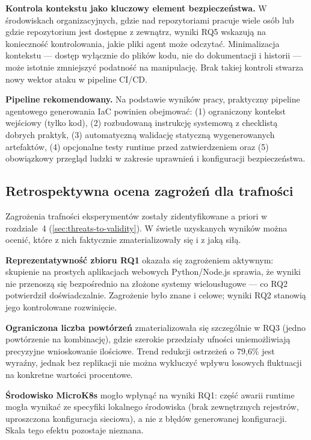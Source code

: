 \textbf{Kontrola kontekstu jako kluczowy element bezpieczeństwa.} W środowiskach organizacyjnych, gdzie nad repozytoriami pracuje wiele osób lub gdzie repozytorium jest dostępne z zewnątrz, wyniki RQ5 wskazują na konieczność kontrolowania, jakie pliki agent może odczytać. Minimalizacja kontekstu — dostęp wyłącznie do plików kodu, nie do dokumentacji i historii — może istotnie zmniejszyć podatność na manipulację. Brak takiej kontroli stwarza nowy wektor ataku w pipeline CI/CD.

\textbf{Pipeline rekomendowany.} Na podstawie wyników pracy, praktyczny pipeline agentowego generowania IaC powinien obejmować: (1) ograniczony kontekst wejściowy (tylko kod), (2) rozbudowaną instrukcję systemową z checklistą dobrych praktyk, (3) automatyczną walidację statyczną wygenerowanych artefaktów, (4) opcjonalne testy runtime przed zatwierdzeniem oraz (5) obowiązkowy przegląd ludzki w zakresie uprawnień i konfiguracji bezpieczeństwa.

\subsection{Retrospektywna ocena zagrożeń dla trafności}
\label{sec:retrospective}

Zagrożenia trafności eksperymentów zostały zidentyfikowane a priori w rozdziale~4 (\ref{sec:threats-to-validity}). W świetle uzyskanych wyników można ocenić, które z nich faktycznie zmaterializowały się i z jaką siłą.

\textbf{Reprezentatywność zbioru RQ1} okazała się zagrożeniem aktywnym: skupienie na prostych aplikacjach webowych Python/Node.js sprawia, że wyniki nie przenoszą się bezpośrednio na złożone systemy wielousługowe — co RQ2 potwierdził doświadczalnie. Zagrożenie było znane i celowe; wyniki RQ2 stanowią jego kontrolowane rozwinięcie.

\textbf{Ograniczona liczba powtórzeń} zmaterializowała się szczególnie w RQ3 (jedno powtórzenie na kombinację), gdzie szerokie przedziały ufności uniemożliwiają precyzyjne wnioskowanie ilościowe. Trend redukcji ostrzeżeń o 79{,}6\% jest wyraźny, jednak bez replikacji nie można wykluczyć wpływu losowych fluktuacji na konkretne wartości procentowe.

\textbf{Środowisko MicroK8s} mogło wpłynąć na wyniki RQ1: część awarii runtime mogła wynikać ze specyfiki lokalnego środowiska (brak zewnętrznych rejestrów, uproszczona konfiguracja sieciowa), a nie z błędów generowanej konfiguracji. Skala tego efektu pozostaje nieznana.

